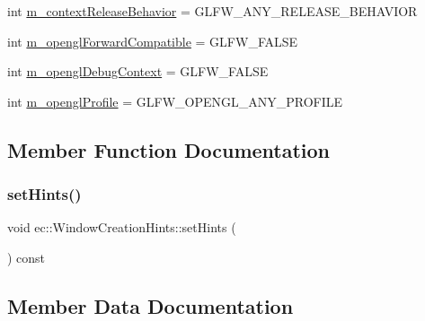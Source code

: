 \begin{DoxyCompactItemize}
\item 
int \mbox{\hyperlink{structec_1_1_window_creation_hints_ac3b3b32240eea7148924b944bea146af}{m\+\_\+context\+Release\+Behavior}} = G\+L\+F\+W\+\_\+\+A\+N\+Y\+\_\+\+R\+E\+L\+E\+A\+S\+E\+\_\+\+B\+E\+H\+A\+V\+I\+OR
\item 
int \mbox{\hyperlink{structec_1_1_window_creation_hints_abfa30a3da29c0037255bb90e5b6a6866}{m\+\_\+opengl\+Forward\+Compatible}} = G\+L\+F\+W\+\_\+\+F\+A\+L\+SE
\item 
int \mbox{\hyperlink{structec_1_1_window_creation_hints_a87a7f6e29e26ba7126e7064e1e60e957}{m\+\_\+opengl\+Debug\+Context}} = G\+L\+F\+W\+\_\+\+F\+A\+L\+SE
\item 
int \mbox{\hyperlink{structec_1_1_window_creation_hints_a872785f08bf23d138d7cc61279ba928c}{m\+\_\+opengl\+Profile}} = G\+L\+F\+W\+\_\+\+O\+P\+E\+N\+G\+L\+\_\+\+A\+N\+Y\+\_\+\+P\+R\+O\+F\+I\+LE
\end{DoxyCompactItemize}


\subsection{Member Function Documentation}
\mbox{\label{structec_1_1_window_creation_hints_ae62c9820ab420fb7ada244293c6ffa27}} 
\subsubsection{\texorpdfstring{set\+Hints()}{setHints()}}
{\footnotesize\ttfamily void ec\+::\+Window\+Creation\+Hints\+::set\+Hints (\begin{DoxyParamCaption}{ }\end{DoxyParamCaption}) const}



\subsection{Member Data Documentation}
\mbox{\label{structec_1_1_window_creation_hints_a41a825d31e2251b3ddcade624bc7eb20}} 
